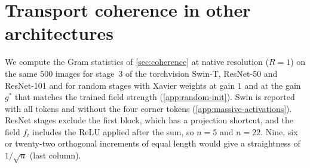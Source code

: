 \section{Transport coherence in other architectures}
\label{app:arch-transport}

We compute the Gram statistics of \cref{sec:coherence} at native
resolution ($R{=}1$) on the same $500$ images for stage~3 of the torchvision Swin-T, ResNet-50 and
ResNet-101 and for random stages with Xavier weights at gain $1$ and at the
gain $g^\ast$ that matches the trained field strength (\cref{app:random-init}).
Swin is reported with all tokens and without the four corner tokens
(\cref{app:massive-activations}).
ResNet stages exclude the first block, which has a projection shortcut, and the field
$f_i$ includes the ReLU applied after the sum, so $n{=}5$ and $n{=}22$.
Nine, six or twenty-two orthogonal increments of equal length would give a
straightness of $1/\sqrt n$ (last column).

\begin{table}[t]
    \centering
    \caption{Stage-3 Gram statistics at $R{=}1$ (mean over $500$ images).
    $s_k{<}0$: share of image and block pairs with negative survival;
    $E$: opposed fraction.}
    \label{tab:app-arch-transport}
    \scriptsize
    \setlength{\tabcolsep}{2.2pt}
\end{table}

